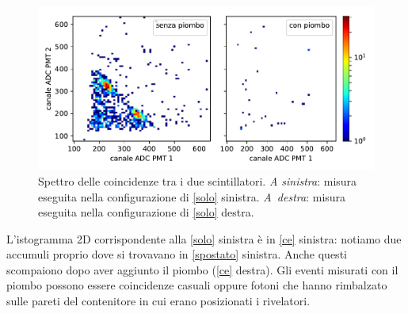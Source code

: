 \begin{figure}[h]
\centering
\includegraphics[width=\textwidth]{immagini/rimb}
\caption{\label{ce}
Spettro delle coincidenze tra i due scintillatori.
\emph{A sinistra}: misura eseguita nella configurazione di \autoref{solo} sinistra.
\emph{A~destra}: misura eseguita nella configurazione di \autoref{solo} destra.}
\end{figure}

L'istogramma 2D corrispondente alla \autoref{solo} sinistra è in \autoref{ce} sinistra: notiamo due accumuli proprio dove si trovavano in \autoref{spostato} sinistra. Anche questi scompaiono dopo aver aggiunto il piombo (\autoref{ce} destra). Gli eventi misurati con il piombo possono essere coincidenze casuali oppure fotoni che hanno rimbalzato sulle pareti del contenitore in cui erano posizionati i rivelatori.

